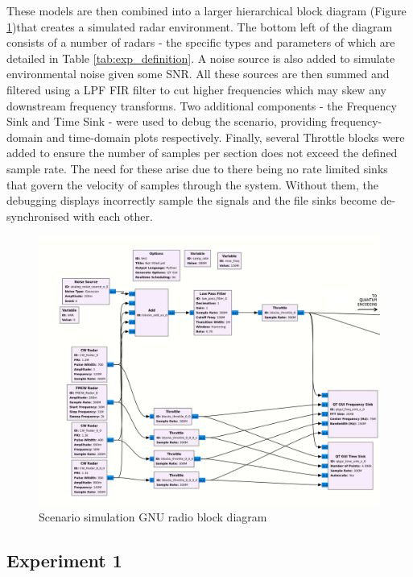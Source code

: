 These models are then combined into a larger hierarchical block diagram (Figure \ref{fig:simulation})that creates a simulated radar environment.
The bottom left of the diagram consists of a number of radars - the specific types and parameters of which are detailed in Table \ref{tab:exp_definition}.
A noise source is also added to simulate environmental noise given some \ac{SNR}.
All these sources are then summed and filtered using a \ac{LPF} \ac{FIR} filter to cut higher frequencies which may skew any downstream frequency transforms.
Two additional components - the Frequency Sink and Time Sink - were used to debug the scenario, providing frequency-domain and time-domain plots respectively.
Finally, several Throttle blocks were added to ensure the number of samples per section does not exceed the defined sample rate.
The need for these arise due to there being no rate limited sinks that govern the velocity of samples through the system. Without them, the debugging displays incorrectly sample the signals and the file sinks become de-synchronised with each other.
% 
\begin{figure}[ht]
    \centering
    \includegraphics[width=1\textwidth]{Figures/simulation.png}
    \caption{Scenario simulation GNU radio block diagram}
    \label{fig:simulation}
\end{figure}


\subsection{Experiment 1}

